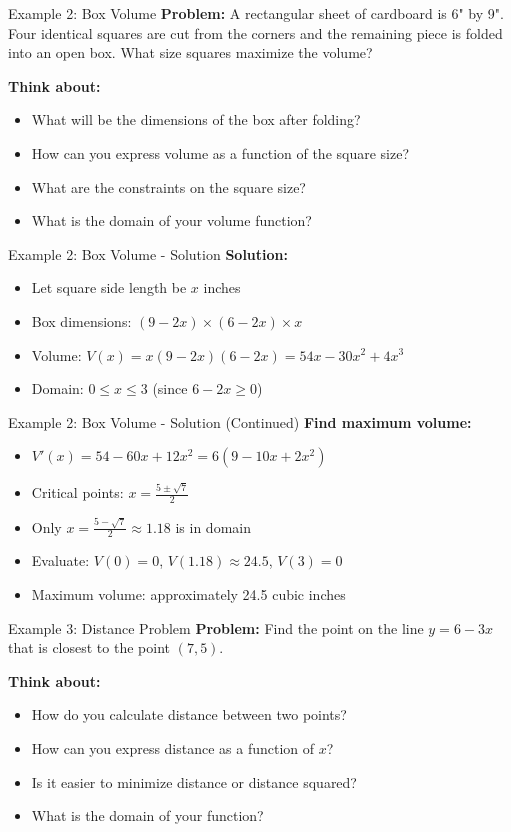 \documentclass[aspectratio=169]{beamer}
\begin{document}
\begin{frame}{Example 2: Box Volume}
\textbf{Problem:} A rectangular sheet of cardboard is 6" by 9". Four identical squares are cut from the corners and the remaining piece is folded into an open box. What size squares maximize the volume?

\textbf{Think about:}
\begin{itemize}
    \item What will be the dimensions of the box after folding?
    \item How can you express volume as a function of the square size?
    \item What are the constraints on the square size?
    \item What is the domain of your volume function?
\end{itemize}
\end{frame}

\begin{frame}{Example 2: Box Volume - Solution}
\textbf{Solution:}
\begin{itemize}
    \item Let square side length be $x$ inches
    \item Box dimensions: $(9-2x) \times (6-2x) \times x$
    \item Volume: $V(x) = x(9-2x)(6-2x) = 54x - 30x^2 + 4x^3$
    \item Domain: $0 \leq x \leq 3$ (since $6-2x \geq 0$)
\end{itemize}
\end{frame}

\begin{frame}{Example 2: Box Volume - Solution (Continued)}
\textbf{Find maximum volume:}
\begin{itemize}
    \item $V'(x) = 54 - 60x + 12x^2 = 6(9 - 10x + 2x^2)$
    \item Critical points: $x = \frac{5 \pm \sqrt{7}}{2}$
    \item Only $x = \frac{5 - \sqrt{7}}{2} \approx 1.18$ is in domain
    \item Evaluate: $V(0) = 0$, $V(1.18) \approx 24.5$, $V(3) = 0$
    \item Maximum volume: approximately 24.5 cubic inches
\end{itemize}
\end{frame}

\begin{frame}{Example 3: Distance Problem}
\textbf{Problem:} Find the point on the line $y = 6 - 3x$ that is closest to the point $(7,5)$.

\textbf{Think about:}
\begin{itemize}
    \item How do you calculate distance between two points?
    \item How can you express distance as a function of $x$?
    \item Is it easier to minimize distance or distance squared?
    \item What is the domain of your function?
\end{itemize}
\end{frame}
\end{document}
